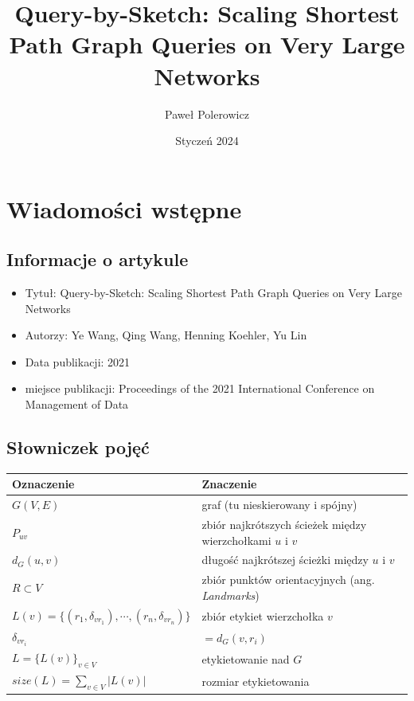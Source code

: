 \documentclass{article}
\title{\textbf{Query-by-Sketch: Scaling Shortest Path Graph Queries on Very Large Networks}}
\author{Paweł Polerowicz}
\date{Styczeń 2024}
\theoremstyle{definition}
\begin{document}
    \maketitle
    \section{Wiadomości wstępne}
    
    \subsection{Informacje o artykule}
    \begin{itemize}
        \item Tytuł: Query-by-Sketch: Scaling Shortest Path Graph Queries on Very Large Networks
        \item Autorzy: Ye Wang, Qing Wang, Henning Koehler, Yu Lin
        \item Data publikacji: 2021
        \item miejsce publikacji: Proceedings of the 2021 International Conference on Management of Data
    \end{itemize}
    
    \subsection{Słowniczek pojęć}

    \begin{tabular}{|l | l |} 
        \hline
        Oznaczenie & Znaczenie \\
        \hline\hline
        $G(V,E)$ & graf (tu nieskierowany i spójny) \\ 
        \hline
        $P_{uv}$ & zbiór najkrótszych ścieżek między wierzchołkami $u$ i $v$ \\ 
        \hline
        $d_G(u, v)$ & długość najkrótszej ścieżki między $u$ i $v$ \\ 
        \hline
        $R \subset V$ & zbiór punktów orientacyjnych (ang. \textit{Landmarks}) \\ 
        \hline
        $L(v) = \{(r_1, \delta_{vr_1}),\cdots,(r_n, \delta_{vr_n})\}$ & zbiór etykiet wierzchołka $v$ \\ 
        \hline
        $\delta_{vr_i}$ & $= d_G(v, r_i)$ \\ 
        \hline
        $L = \{L(v)\}_{v \in V}$ & etykietowanie nad $G$\\ 
        \hline
        $size(L) = \sum_{v \in V}|L(v)|$ & rozmiar etykietowania \\ 
        \hline
    \end{tabular}\\
    
\end{document}
